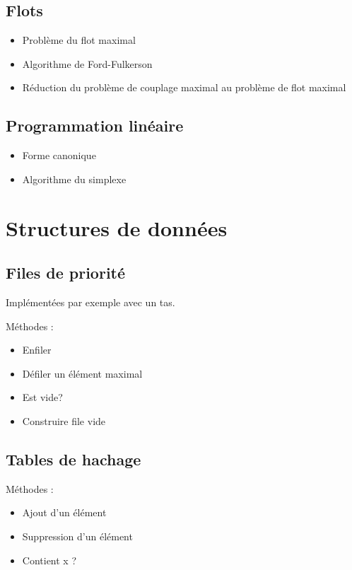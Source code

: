 \documentclass[10pt,a4paper]{article}
\begin{document}
\subsection{Flots}

\begin{itemize}[noitemsep]
	\item Problème du flot maximal
	\item Algorithme de Ford-Fulkerson
	\item Réduction du problème de couplage maximal au problème de flot maximal
\end{itemize}


\subsection{Programmation linéaire}

\begin{itemize}[noitemsep]
	\item Forme canonique
	\item Algorithme du simplexe
\end{itemize}


\section{Structures de données}

%
\subsection{Files de priorité}

Implémentées par exemple avec un tas.

Méthodes : 
\begin{itemize}[noitemsep]
	\item Enfiler
	\item Défiler un élément maximal
	\item Est vide?
	\item Construire file vide
\end{itemize}

\subsection{Tables de hachage}
	
Méthodes : 
\begin{itemize}[noitemsep]
	\item Ajout d'un élément
	\item Suppression d'un élément
	\item Contient x ?
\end{itemize}
\end{document}
